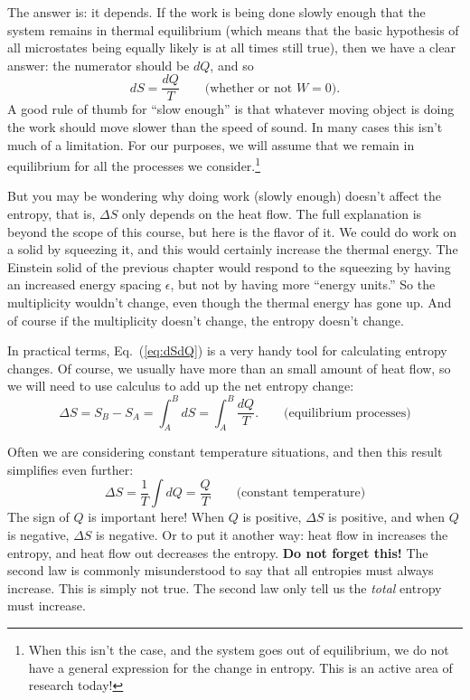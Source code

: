 The answer is: it depends.  If the work is being done slowly enough
that the system remains in thermal equilibrium (which means that the
basic hypothesis of all microstates being equally likely is at all
times still true), then we have a clear answer: the numerator should
be $dQ$, and so
\begin{equation}
dS = \frac{dQ}{T}  \qquad\text{(whether or not $W=0$)}.
\label{eq:dSdQ}
\end{equation}
A good rule of thumb for ``slow enough'' is that whatever moving
object is doing the work should move slower than the speed of sound.
In many cases this isn't much of a limitation.  For our purposes, we
will assume that we remain in equilibrium for all the processes we
consider.\footnote{When this isn't the case, and the system goes out
  of equilibrium, we do not have a general expression for the change
  in entropy.  This is an active area of research today!}

But you may be wondering why doing work (slowly enough) doesn't affect
the entropy, that is, $\Delta S$ only depends on the heat flow.  The
full explanation is beyond the scope of this course, but here is the
flavor of it.  We could do work on a solid by squeezing it, and this
would certainly increase the thermal energy.  The Einstein solid of
the previous chapter would respond to the squeezing by having an
increased energy spacing $\epsilon$, but not by having more ``energy
units.''  So the multiplicity wouldn't change, even though the thermal
energy has gone up.  And of course if the multiplicity doesn't change,
the entropy doesn't change.

In practical terms, Eq.~(\ref{eq:dSdQ}) is a very handy tool for
calculating entropy changes.  Of course, we usually have more than an
small amount of heat flow, so we will need to use calculus to add up
the net entropy change:
\begin{equation}
\Delta S = S_B - S_A = \int_A^B dS = \int_A^B \frac{dQ}{T}.
\qquad\text{(equilibrium processes)}
\label{eq:DeltaSgeneral}
\end{equation}

Often we are considering constant temperature situations, and then
this result simplifies even further:
\begin{equation}
\Delta S= \frac{1}{T}\int dQ = \frac{Q}{T} \qquad\text{(constant temperature)}
\label{eq:deltaS_isothermal}
\end{equation}
The sign of $Q$ is important here!  When $Q$ is positive, $\Delta S$
is positive, and when $Q$ is negative, $\Delta S$ is negative.  Or to
put it another way: heat flow in increases the entropy, and heat flow
out decreases the entropy.  {\bf Do not forget this!}  The second law
is commonly misunderstood to say that all entropies must always
increase.  This is simply not true.  The second law only tell us the
{\it total} entropy must increase.

